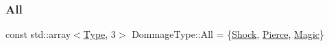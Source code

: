 \subsubsection{\texorpdfstring{All}{All}}
{\footnotesize\ttfamily const std\+::array$<$\hyperlink{namespaceDommageType_a6e5dff665b7631fe6ec9065dddbebcfd}{Type}, 3$>$ Dommage\+Type\+::\+All = \{\hyperlink{namespaceDommageType_a6e5dff665b7631fe6ec9065dddbebcfdad7195516d2e659e73c0f22e64249517b}{Shock}, \hyperlink{namespaceDommageType_a6e5dff665b7631fe6ec9065dddbebcfdabca33f1e8d86b9faddd26010eb172ec0}{Pierce}, \hyperlink{namespaceDommageType_a6e5dff665b7631fe6ec9065dddbebcfdab12cf1b0c6c2cd00d9466c6cab208137}{Magic}\}}

